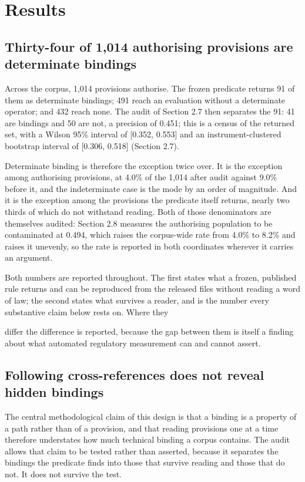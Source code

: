\section{Results}\label{sec:3}

\subsection{Thirty-four of 1,014 authorising provisions are determinate bindings}\label{sec:3.1}

Across the corpus, 1,014 provisions authorise. The frozen predicate returns 91 of them as determinate bindings; 491 reach an evaluation without a determinate operator; and 432 reach none. The audit of Section 2.7 then separates the 91: 41 are bindings and 50 are not, a precision of 0.451; this is a census of the returned set, with a Wilson 95\% interval of [0.352, 0.553] and an instrument-clustered bootstrap interval of [0.306, 0.518] (Section 2.7).

Determinate binding is therefore the exception twice over. It is the exception among authorising provisions, at 4.0\% of the 1,014 after audit against 9.0\% before it, and the indeterminate case is the mode by an order of magnitude. And it is the exception among the provisions the predicate itself returns, nearly two thirds of which do not withstand reading. Both of those denominators are themselves audited: Section 2.8 measures the authorising population to be contaminated at 0.494, which raises the corpus-wide rate from 4.0\% to 8.2\% and raises it unevenly, so the rate is reported in both coordinates wherever it carries an argument.

Both numbers are reported throughout. The first states what a frozen, published rule returns and can be reproduced from the released files without reading a word of law; the second states what survives a reader, and is the number every substantive claim below rests on. Where they

differ the difference is reported, because the gap between them is itself a finding about what automated regulatory measurement can and cannot assert.

\subsection{Following cross-references does not reveal hidden bindings}\label{sec:3.2}

The central methodological claim of this design is that a binding is a property of a path rather than of a provision, and that reading provisions one at a time therefore understates how much technical binding a corpus contains. The audit allows that claim to be tested rather than asserted, because it separates the bindings the predicate finds into those that survive reading and those that do not. It does not survive the test.

